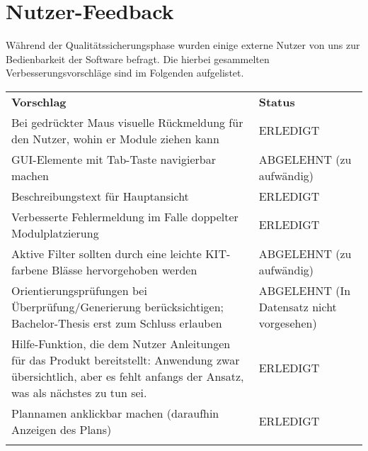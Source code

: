 \FloatBarrier
\section{Nutzer-Feedback}

Während der Qualitätssicherungsphase wurden einige externe Nutzer von uns zur Bedienbarkeit der Software befragt. Die hierbei gesammelten Verbesserungsvorschläge sind im Folgenden aufgelistet.

\begin{longtable}{| >{\hspace{0pt}} p{} | >{\hspace{0pt}} p{} | }
	\hline
	\textbf{Vorschlag} & \textbf{Status} \\ 
	\hhline{|=|=|}
	\endfirsthead
	\endhead
	Bei gedrückter Maus visuelle Rückmeldung für den Nutzer, wohin er Module ziehen kann 
	& ERLEDIGT \\
	\hline
	GUI-Elemente mit Tab-Taste navigierbar machen 
	& ABGELEHNT (zu aufwändig) \\
	\hline 
	Beschreibungstext für Hauptansicht 
	& ERLEDIGT \\
	\hline
	Verbesserte Fehlermeldung im Falle doppelter Modulplatzierung
	& ERLEDIGT \\
	\hline
	Aktive Filter sollten durch eine leichte KIT-farbene Blässe hervorgehoben werden
	& ABGELEHNT (zu aufwändig) \\
	\hline
	Orientierungsprüfungen bei Überprüfung/Generierung berücksichtigen; Bachelor-Thesis erst zum Schluss erlauben
	& ABGELEHNT (In Datensatz nicht vorgesehen) \\
	\hline
	Hilfe-Funktion, die dem Nutzer Anleitungen für das Produkt bereitstellt: Anwendung zwar übersichtlich, aber es fehlt anfangs der Ansatz, was als nächstes zu tun sei.
	& ERLEDIGT \\
	\hline
	Plannamen anklickbar machen (daraufhin Anzeigen des Plans)
	& ERLEDIGT \\
	\hhline{|=|=|}
\end{longtable}